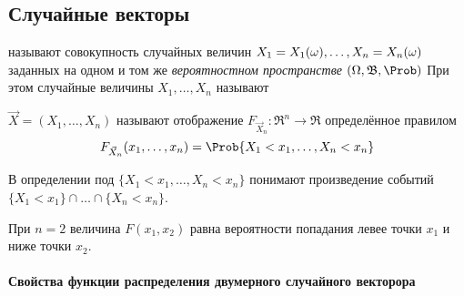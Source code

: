 \subsection{Случайные векторы}

\begin{definition}
	 называют совокупность случайных величин $X_1 = X_1(\omega), \dots, X_n = X_n(\omega)$ заданных на одном и том же \textit{вероятностном пространстве} $(\spaceoutcomes, \sigmaalgebra, \Prob)$ При этом случайные величины $X_1, \dots, X_n$ называют 
\end{definition}

\begin{definition}
	 $\vec{X} = (X_1, \dots, X_n)$ называют отображение $F_{\vec{X}_n}\colon \Re^n \to \Re$ определённое правилом
	\[
		F_{\vec{X}_n}(x_1, \dots, x_n) = \Prob\{X_1 < x_1, \dots, X_n < x_n\}
	\]
\end{definition}
\begin{rem}
	В определении под $\{X_1 < x_1, \dots, X_n < x_n\}$ понимают произведение событий $\{X_1 < x_1\} \cap \dots \cap \{X_n < x_n\}$.
\end{rem}
\begin{rem}
	При $n=2$ величина $F(x_1, x_2)$ равна вероятности попадания левее точки $x_1$ и ниже точки $x_2$.
\end{rem}

\paragraph{Свойства функции распределения двумерного случайного векторора}

